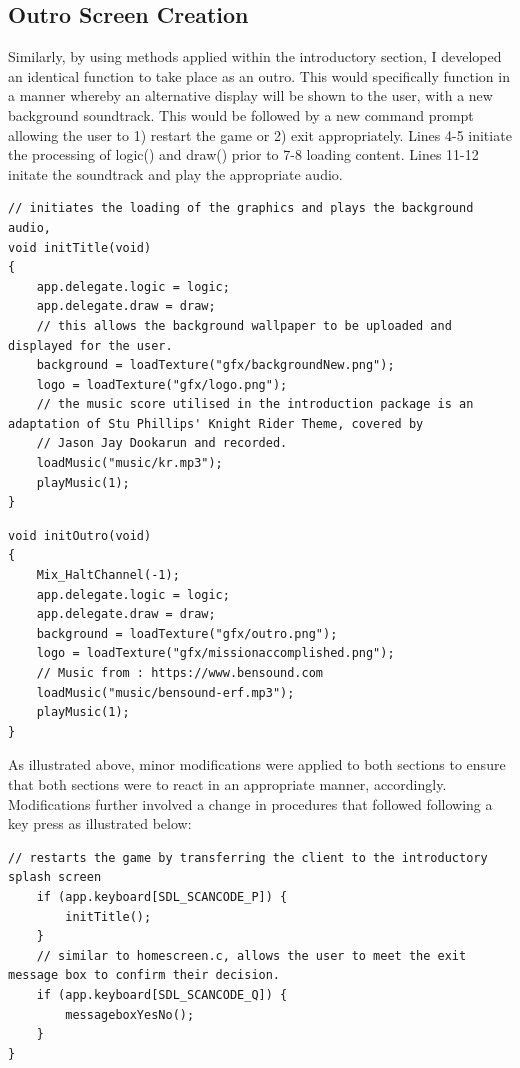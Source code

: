\documentclass{article}
\begin{document}
\subsection{Outro Screen Creation}
Similarly, by using methods applied within the introductory section, I developed an identical function to take place as an outro. This would specifically function in a manner whereby an alternative display will be shown to the user, with a new background soundtrack. This would be followed by a new command prompt allowing the user to 1) restart the game or 2) exit appropriately. Lines 4-5 initiate the processing of logic() and draw() prior to 7-8 loading content. Lines 11-12 initate the soundtrack and play the appropriate audio.
\begin{lstlisting}[caption={homescreen.c initTitle() sequence},captionpos=b]
// initiates the loading of the graphics and plays the background audio,
void initTitle(void)
{
	app.delegate.logic = logic;
	app.delegate.draw = draw;
	// this allows the background wallpaper to be uploaded and displayed for the user.
	background = loadTexture("gfx/backgroundNew.png");
	logo = loadTexture("gfx/logo.png");
	// the music score utilised in the introduction package is an adaptation of Stu Phillips' Knight Rider Theme, covered by
	// Jason Jay Dookarun and recorded.
	loadMusic("music/kr.mp3");
	playMusic(1);
}
\end{lstlisting}
\begin{lstlisting}[caption={outro.c initOutro() sequence},captionpos=b]
void initOutro(void)
{
	Mix_HaltChannel(-1);
	app.delegate.logic = logic;
	app.delegate.draw = draw;
	background = loadTexture("gfx/outro.png");
	logo = loadTexture("gfx/missionaccomplished.png");
	// Music from : https://www.bensound.com
	loadMusic("music/bensound-erf.mp3");
	playMusic(1);
}
\end{lstlisting}
As illustrated above, minor modifications were applied to both sections to ensure that both sections were to react in an appropriate manner, accordingly. Modifications further involved a change in procedures that followed following a key press as illustrated below:

\begin{lstlisting}[caption={outro.c Key Press Process},captionpos=b]
// restarts the game by transferring the client to the introductory splash screen
	if (app.keyboard[SDL_SCANCODE_P]) {
		initTitle();
	}
	// similar to homescreen.c, allows the user to meet the exit message box to confirm their decision.
	if (app.keyboard[SDL_SCANCODE_Q]) {
		messageboxYesNo();
	}
}
\end{lstlisting}
\end{document}
